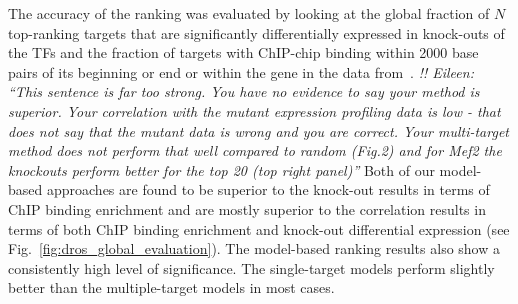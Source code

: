 \documentclass{pnastwo}
\begin{document}
\begin{article}
The accuracy of the ranking was evaluated by looking at the global
fraction of $N$ top-ranking targets that are significantly
differentially expressed in knock-outs of the TFs and the fraction
of targets with ChIP-chip binding within 2000 base
pairs of its beginning or end or within the gene in the data
from~\cite{Zinzen2009}. 
\emph{!! Eileen: ``This sentence is far too strong.  You have no
  evidence to say your method is superior.  Your correlation with the
  mutant expression profiling data is low - that does not say that the
  mutant data is wrong and you are correct.  Your multi-target method
  does not perform that well compared to random (Fig.2) and for Mef2
  the knockouts perform better for the top 20 (top right panel)''}
Both of our model-based approaches are found to
be superior to the knock-out results in terms of ChIP binding
enrichment and are mostly superior to the correlation results in terms
of both ChIP binding enrichment and knock-out differential expression
(see Fig.~\ref{fig:dros_global_evaluation}). The model-based ranking
results also show a consistently high level of significance. The
single-target models perform slightly better than the multiple-target
models in most cases.


\end{article}
\end{document}
